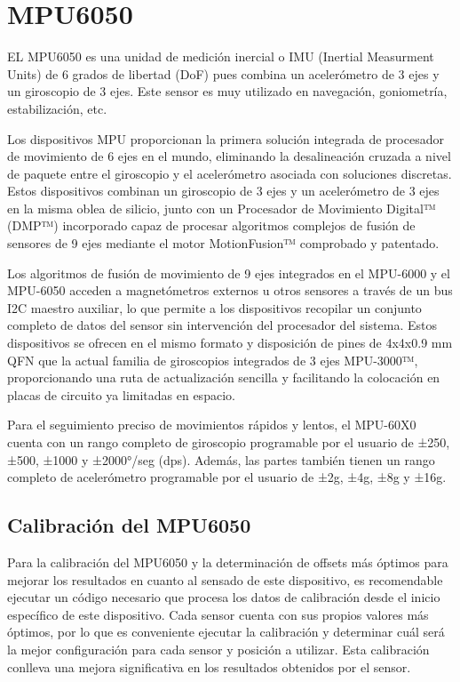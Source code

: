 \section{MPU6050}

EL MPU6050 es una unidad de medición inercial o IMU (Inertial Measurment Units) de 6 grados de libertad (DoF) pues combina un acelerómetro de 3 ejes y un giroscopio de 3 ejes. Este sensor es muy utilizado en navegación, goniometría, estabilización, etc.

Los dispositivos MPU proporcionan la primera solución integrada de procesador de movimiento de 6 ejes en el mundo, eliminando la desalineación cruzada a nivel de paquete entre el giroscopio y el acelerómetro asociada con soluciones discretas. Estos dispositivos combinan un giroscopio de 3 ejes y un acelerómetro de 3 ejes en la misma oblea de silicio, junto con un Procesador de Movimiento Digital™ (DMP™) incorporado capaz de procesar algoritmos complejos de fusión de sensores de 9 ejes mediante el motor MotionFusion™ comprobado y patentado.

Los algoritmos de fusión de movimiento de 9 ejes integrados en el MPU-6000 y el MPU-6050 acceden a magnetómetros externos u otros sensores a través de un bus I2C maestro auxiliar, lo que permite a los dispositivos recopilar un conjunto completo de datos del sensor sin intervención del procesador del sistema. Estos dispositivos se ofrecen en el mismo formato y disposición de pines de 4x4x0.9 mm QFN que la actual familia de giroscopios integrados de 3 ejes MPU-3000™, proporcionando una ruta de actualización sencilla y facilitando la colocación en placas de circuito ya limitadas en espacio.

Para el seguimiento preciso de movimientos rápidos y lentos, el MPU-60X0 cuenta con un rango completo de giroscopio programable por el usuario de ±250, ±500, ±1000 y ±2000°/seg (dps). Además, las partes también tienen un rango completo de acelerómetro programable por el usuario de ±2g, ±4g, ±8g y ±16g.

\subsection{Calibración del MPU6050}

Para la calibración del MPU6050 y la determinación de offsets más óptimos para mejorar los resultados en cuanto al sensado de este dispositivo, es recomendable ejecutar un código necesario que procesa los datos de calibración desde el inicio específico de este dispositivo. Cada sensor cuenta con sus propios valores más óptimos, por lo que es conveniente ejecutar la calibración y determinar cuál será la mejor configuración para cada sensor y posición a utilizar. Esta calibración conlleva una mejora significativa en los resultados obtenidos por el sensor.

